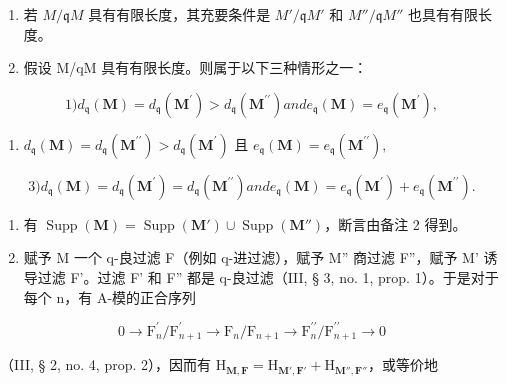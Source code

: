 \begin{enumerate}
\def\labelenumi{\alph{enumi})}
\item
  若 \(M/\mathfrak{q}M\) 具有有限长度，其充要条件是 \(M'/\mathfrak{q}M'\) 和 \(M''/\mathfrak{q}M''\) 也具有有限长度。
\item
  假设 M/qM 具有有限长度。则属于以下三种情形之一：
\end{enumerate}

\[
1) d _ {\mathfrak {q}} (\mathbf {M}) = d _ {\mathfrak {q}} \left(\mathbf {M} ^ {\prime}\right) > d _ {\mathfrak {q}} \left(\mathbf {M} ^ {\prime \prime}\right) and e _ {\mathfrak {q}} (\mathbf {M}) = e _ {\mathfrak {q}} \left(\mathbf {M} ^ {\prime}\right),
\]

\begin{enumerate}
\def\labelenumi{\arabic{enumi})}
\setcounter{enumi}{1}
\tightlist
\item
  \(d_{\mathfrak{q}}(\mathbf{M}) = d_{\mathfrak{q}}(\mathbf{M}^{\prime \prime}) > d_{\mathfrak{q}}(\mathbf{M}^{\prime})\) 且 \(e_{\mathfrak{q}}(\mathbf{M}) = e_{\mathfrak{q}}(\mathbf{M}^{\prime \prime}),\)
\end{enumerate}

\[
3) d _ {\mathfrak {q}} (\mathbf {M}) = d _ {\mathfrak {q}} \left(\mathbf {M} ^ {\prime}\right) = d _ {\mathfrak {q}} \left(\mathbf {M} ^ {\prime \prime}\right) and e _ {\mathfrak {q}} (\mathbf {M}) = e _ {\mathfrak {q}} \left(\mathbf {M} ^ {\prime}\right) + e _ {\mathfrak {q}} \left(\mathbf {M} ^ {\prime \prime}\right).
\]

\begin{enumerate}
\def\labelenumi{\alph{enumi})}
\item
  有 \(\operatorname{Supp}(\mathbf{M}) = \operatorname{Supp}(\mathbf{M}') \cup \operatorname{Supp}(\mathbf{M}'')\)，断言由备注 2 得到。
\item
  赋予 M 一个 q-良过滤 F（例如 q-进过滤），赋予 M'' 商过滤 F''，赋予 M' 诱导过滤 F'。过滤 F' 和 F'' 都是 q-良过滤（III, § 3, no. 1, prop. 1）。于是对于每个 n，有 A-模的正合序列
\end{enumerate}

\[
0 \rightarrow \mathrm{F} _ {n} ^ {\prime} / \mathrm{F} _ {n + 1} ^ {\prime} \rightarrow \mathrm{F} _ {n} / \mathrm{F} _ {n + 1} \rightarrow \mathrm{F} _ {n} ^ {\prime \prime} / \mathrm{F} _ {n + 1} ^ {\prime \prime} \rightarrow 0
\]

（III, § 2, no. 4, prop. 2），因而有 \(\mathrm{H}_{\mathbf{M},\mathbf{F}} = \mathrm{H}_{\mathbf{M}',\mathbf{F}'} + \mathrm{H}_{\mathbf{M}'',\mathbf{F}''}\)，或等价地

